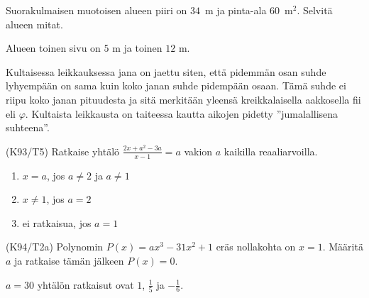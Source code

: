 \begin{tehtavasivu}
\begin{tehtava}
    Suorakulmaisen muotoisen alueen piiri on $34$~m ja pinta-ala $60$~m$^2$. Selvitä alueen mitat.
    \begin{vastaus}
		Alueen toinen sivu on $5$ m ja toinen $12$ m.
    \end{vastaus}
\end{tehtava}

\begin{tehtava}
    Kultaisessa leikkauksessa jana on jaettu siten, että pidemmän osan suhde lyhyempään on sama kuin koko janan suhde pidempään osaan. Tämä suhde ei riipu koko janan pituudesta ja sitä merkitään yleensä kreikkalaisella aakkosella fii eli $\varphi$. Kultaista leikkausta on taiteessa kautta aikojen pidetty ''jumalallisena suhteena''.
		\begin{alakohdat}
        \end{alakohdat}
    \begin{vastaus}
        \begin{alakohdat}
        \end{alakohdat}
    \end{vastaus}
\end{tehtava}

\begin{tehtava}
(K93/T5) Ratkaise yhtälö
        $\frac{2x+a^2-3a}{x-1}=a$ vakion $a$ kaikilla reaaliarvoilla.
\begin{vastaus}
        \begin{enumerate}
         \item{$x=a$, jos $a \neq 2$ ja $a \neq 1$}
         \item{$x\neq 1$, jos $a=2$}
         \item{ei ratkaisua, jos $a=1$}
        \end{enumerate}
    \end{vastaus}
\end{tehtava}

\begin{tehtava}
(K94/T2a) Polynomin $P(x)=ax^3-31x^2+1$ eräs nollakohta on $x=1$. Määritä $a$ ja ratkaise tämän jälkeen $P(x)=0$.
\begin{vastaus}
      $a=30$ yhtälön ratkaisut ovat $1$, $\frac{1}{5}$ ja $-\frac{1}{6}$.
    \end{vastaus}
\end{tehtava}


\end{tehtavasivu}

